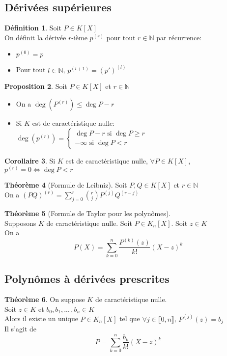 \documentclass[10pt,a4paper]{article}
\theoremstyle{definition}
\newtheorem{proposition}{Proposition}[section]
\newtheorem{theorem}[proposition]{Théorème}
\newtheorem{corollaire}[proposition]{Corollaire}
\newtheorem{definition}[proposition]{Définition}
\begin{document}
\subsection{Dérivées supérieures}
\begin{definition}
Soit $P \in K[X]$ \\
On définit \uline{la dérivée $r$-ième} $p^{(r)}$ pour tout $r \in \mathbb{N}$ par récurrence:
\begin{itemize}
\item $p^{(0)} = p$
\item Pour tout $l \in \mathbb{N}$, $p^{(l + 1)} = (p')^{(l)}$
\end{itemize}
\end{definition}
\begin{proposition}
Soit $P \in K[X]$ et $r \in \mathbb{N}$
\begin{itemize}
\item On a $\deg(P^{(r)}) \leq \deg P - r$
\item Si $K$ est de caractéristique nulle: \\
$\deg(p^{(r)}) = \begin{cases}
\deg P - r \text{ si } \deg P \geq r \\
-\infty \text{ si } \deg P < r
\end{cases}$
\end{itemize}
\end{proposition}
\begin{corollaire}
Si $K$ est de caractéristique nulle, $\forall P \in K[X]$, $p^{(r)} = 0 \iff \deg P < r$
\end{corollaire}
\begin{theorem}[Formule de Leibniz]
Soit $P, Q \in K[X]$ et $r \in \mathbb{N}$ \\
On a $(PQ)^{(r)} = \sum\limits_{j = 0}^r \binom{r}{j} P^{(j)} Q^{(r - j)}$
\end{theorem}
\begin{theorem}[Formule de Taylor pour les polynômes]
\hfill \\
Supposons $K$ de caractéristique nulle. Soit $P \in K_n[X]$. Soit $z \in K$ \\
On a
\[ P(X) = \sum_{k = 0}^n \frac{P^{(k)}(z)}{k!} (X - z)^k \]
\end{theorem}

\pagebreak

\subsection{Polynômes à dérivées prescrites}
\begin{theorem}
On suppose $K$ de caractéristique nulle. \\
Soit $z \in K$ et $b_0, b_1, ...\,, b_n \in K$ \\
Alors il existe un unique $P \in K_n[X]$ tel que $\forall j \in \llbracket 0, n \rrbracket$, $P^{(j)}(z) = b_j$ \\
Il s'agit de
\[ P = \sum_{k = 0}^n \frac{b_k}{k!} (X - z)^k \]
\end{theorem}
\end{document}
